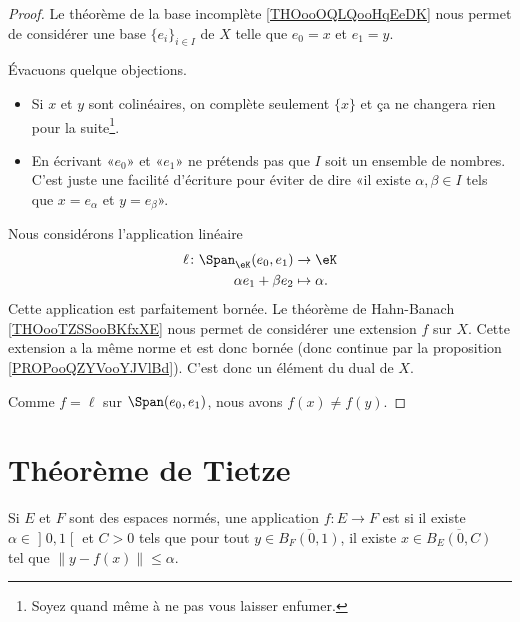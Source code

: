 	\begin{proof}
		Le théorème de la base incomplète \ref{THOooOQLQooHqEeDK} nous permet de considérer une base \( \{ e_i \}_{i\in I}\) de \( X\) telle que \( e_0=x\) et \( e_1=y\).

		Évacuons quelque objections.
		\begin{itemize}
			\item Si \( x\) et \( y\) sont colinéaires, on complète seulement \( \{ x \}\) et ça ne changera rien pour la suite\footnote{Soyez quand même  à ne pas vous laisser enfumer.}.
			\item En écrivant «\( e_0\)» et «\( e_1\)»  ne prétends pas que \( I\) soit un ensemble de nombres. C'est juste une facilité d'écriture pour éviter de dire «il existe \( \alpha,\beta\in I\) tels que \( x=e_{\alpha}\) et \( y=e_{\beta}\)».
		\end{itemize}
		Nous considérons l'application linéaire
		\begin{equation}
			\begin{aligned}
				\ell\colon \Span_{\eK}(e_0,e_1) & \to \eK         \\
				\alpha e_1+\beta e_2            & \mapsto \alpha.
			\end{aligned}
		\end{equation}
		Cette application est parfaitement bornée. Le théorème de Hahn-Banach \ref{THOooTZSSooBKfxXE} nous permet de considérer une extension \( f\) sur \( X\). Cette extension a la même norme et est donc bornée (donc continue par la proposition \ref{PROPooQZYVooYJVlBd}). C'est donc un élément du dual de \( X\).

		Comme \( f=\ell\) sur \( \Span(e_0,e_1)\), nous avons \( f(x)\neq f(y)\).
	\end{proof}

	\section{Théorème de Tietze}

	\begin{definition}
		Si \( E\) et \( F\) sont des espaces normés, une application \( f\colon E\to F\) est  si il existe \( \alpha\in\mathopen] 0 , 1 \mathclose[\) et \( C>0\) tels que pour tout \( y\in \overline{ B_F(0,1) }\), il existe \( x\in\overline{ B_E(0,C) }\) tel que \( \| y-f(x) \|\leq \alpha\).
	\end{definition}

